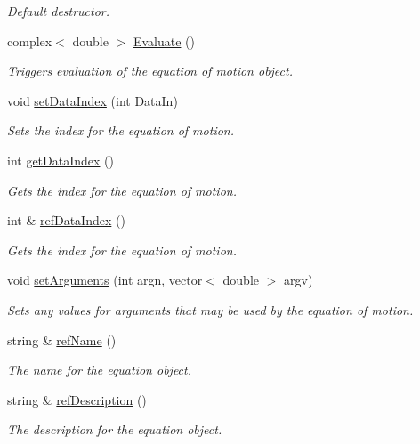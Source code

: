 \begin{DoxyCompactItemize}
\begin{DoxyCompactList}\small\item\em Default destructor. \end{DoxyCompactList}\item 
complex$<$ double $>$ \hyperlink{class_equationof_motion_a7198b4661f6c0a4c1f280863228bd63c}{Evaluate} ()
\begin{DoxyCompactList}\small\item\em Triggers evaluation of the equation of motion object. \end{DoxyCompactList}\item 
void \hyperlink{class_equationof_motion_a5a8674f3d8715973fa0affc162ae677c}{set\-Data\-Index} (int Data\-In)
\begin{DoxyCompactList}\small\item\em Sets the index for the equation of motion. \end{DoxyCompactList}\item 
int \hyperlink{class_equationof_motion_a45052d6a9814ffa899d1824f5d8e8cee}{get\-Data\-Index} ()
\begin{DoxyCompactList}\small\item\em Gets the index for the equation of motion. \end{DoxyCompactList}\item 
int \& \hyperlink{class_equationof_motion_ae16051cbf725210aa44941d41d8800e2}{ref\-Data\-Index} ()
\begin{DoxyCompactList}\small\item\em Gets the index for the equation of motion. \end{DoxyCompactList}\item 
void \hyperlink{class_equationof_motion_ad93006b4658c7b2809770866511581ad}{set\-Arguments} (int argn, vector$<$ double $>$ argv)
\begin{DoxyCompactList}\small\item\em Sets any values for arguments that may be used by the equation of motion. \end{DoxyCompactList}\item 
string \& \hyperlink{class_equationof_motion_abb7b1a4295e8406ea4f155b1f03689f6}{ref\-Name} ()
\begin{DoxyCompactList}\small\item\em The name for the equation object. \end{DoxyCompactList}\item 
string \& \hyperlink{class_equationof_motion_a5be5a333dd1a5a65eaadec4b32c68fb5}{ref\-Description} ()
\begin{DoxyCompactList}\small\item\em The description for the equation object. \end{DoxyCompactList}\end{DoxyCompactItemize}
